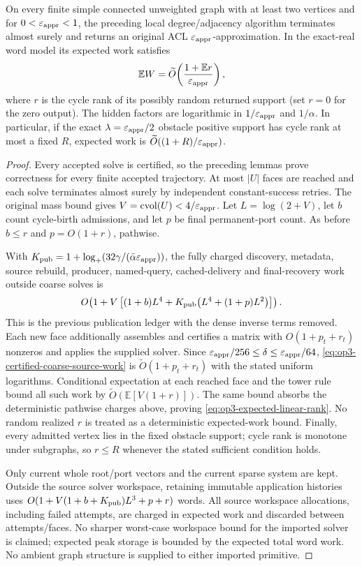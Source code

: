 \begin{theorem}
\label{thm:op3-certified-linear-rank}
On every finite simple connected unweighted graph with at least two
vertices and for $0<\varepsilon_{\mathrm{appr}}<1$, the preceding local degree/adjacency
algorithm terminates almost surely and returns an original ACL
$\varepsilon_{\mathrm{appr}}$-approximation. In the
exact-real word model its expected work satisfies
\begin{equation}
 \mathbb E W=\widetilde O\!\left(
       \frac{1+\mathbb E r}{\varepsilon_{\mathrm{appr}}}\right),
 \label{eq:op3-expected-linear-rank}
\end{equation}
where $r$ is the cycle rank of its possibly random returned support
(set $r=0$ for the zero output). The hidden factors are logarithmic in
$1/\varepsilon_{\mathrm{appr}}$ and $1/\alpha$. In particular, if the exact
$\lambda=\varepsilon_{\mathrm{appr}}/2$ obstacle positive support has cycle rank at most a
fixed $R$, expected work is
$\widetilde O((1+R)/\varepsilon_{\mathrm{appr}})$.
\end{theorem}
\begin{proof}
Every accepted solve is certified, so the preceding lemmas prove correctness
for every finite accepted trajectory. At most $|U|$ faces are reached and
each solve terminates almost surely by independent constant-success retries.
The original mass bound gives
$V=\operatorname{cvol}(U)<4/\varepsilon_{\mathrm{appr}}$. Let
$L=\log(2+V)$, let $b$ count cycle-birth admissions, and let $p$ be final
permanent-port count. As before $b\leq r$ and $p=O(1+r)$, pathwise.

With $K_{
\rm pub}=1+\log_+(32\gamma/(\bar\alpha\varepsilon_{\mathrm{appr}}))$, the fully charged
discovery, metadata, source rebuild, producer, named-query, cached-delivery
and final-recovery work outside coarse solves is
\[
 O\!\left(1+V\left[(1+b)L^4+
 K_{\rm pub}\bigl(L^4+(1+p)L^2\bigr)\right]\right).
\]
This is the previous publication ledger with the dense inverse terms
removed. Each new face additionally assembles and certifies a matrix with
$O(1+p_t+r_t)$ nonzeros and applies the supplied solver.
Since $\varepsilon_{\mathrm{appr}}/256\leq\delta\leq\varepsilon_{\mathrm{appr}}/64$,
\cref{eq:op3-certified-coarse-source-work} is
$\widetilde O(1+p_t+r_t)$ with the stated uniform logarithms.
Conditional expectation at each reached face and the tower rule bound all
such work by $\widetilde O(\mathbb E[V(1+r)])$.
The same bound absorbs the deterministic pathwise charges above, proving
\cref{eq:op3-expected-linear-rank}. No random realized $r$ is treated as a
deterministic expected-work bound. Finally, every admitted vertex lies in
the fixed obstacle support; cycle rank is monotone under subgraphs, so
$r\leq R$ whenever the stated sufficient condition holds.

Only current whole root/port vectors and the current sparse system are kept.
Outside the source solver workspace, retaining immutable application
histories uses $O(1+V(1+b+K_{\rm pub})L^3+p+r)$ words. All source workspace
allocations, including failed attempts, are charged in expected work and
discarded between attempts/faces. No sharper worst-case workspace bound
for the imported solver is claimed; expected peak storage is bounded by
the expected total word work. No ambient graph structure is supplied to
either imported primitive.
\end{proof}

